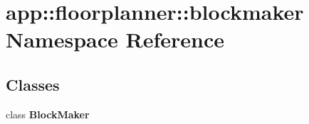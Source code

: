 \section{app::floorplanner::blockmaker Namespace Reference}
\label{namespaceapp_1_1floorplanner_1_1blockmaker}


\subsection*{Classes}
\begin{CompactItemize}
\item 
class {\bf BlockMaker}
\end{CompactItemize}
